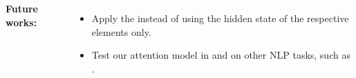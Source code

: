 \documentclass[25pt, a0paper,
               colspace=15mm, subcolspace=0mm,
               blockverticalspace=17mm,
               landscape]{tikzposter} %
\begin{document}
\begin{columns}
{    \textbf{Future works:}
    \begin{itemize}
        \item  Apply the  instead of using the hidden state of the respective elements only.
        \item Test our attention model in  and on other NLP tasks, such as .
    \end{itemize}
    \vspace{-3.5mm}
  }
\end{columns}
\end{document}
